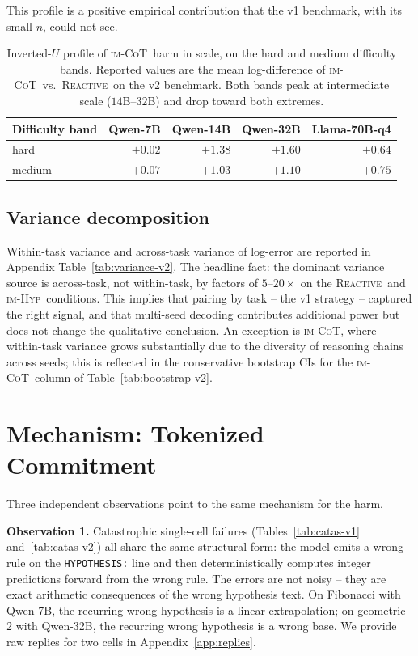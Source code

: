 \documentclass[11pt]{article}
\newcommand{\imhyp}{\textsc{im-Hyp}}
\newcommand{\imcot}{\textsc{im-CoT}}
\newcommand{\reactive}{\textsc{Reactive}}
\begin{document}
This profile is a positive empirical contribution that the v1
benchmark, with its small $n$, could not see.

\begin{table}[t]
\centering
\caption{Inverted-$U$ profile of \imcot\ harm in scale, on the
hard and medium difficulty bands.  Reported values are the mean
log-difference of \imcot\ vs.\ \reactive\ on the v2 benchmark.
Both bands peak at intermediate scale ($14$B--$32$B) and drop
toward both extremes.}
\label{fig:invertedU}
\small
\begin{tabular}{l rrrr}
\toprule
Difficulty band & Qwen-7B & Qwen-14B & Qwen-32B & Llama-70B-q4 \\
\midrule
hard   & $+0.02$ & $+1.38$ & $+1.60$ & $+0.64$ \\
medium & $+0.07$ & $+1.03$ & $+1.10$ & $+0.75$ \\
\bottomrule
\end{tabular}
\end{table}

\subsection{Variance decomposition}

Within-task variance and across-task variance of log-error are
reported in Appendix Table~\ref{tab:variance-v2}.  The headline
fact:  the dominant variance source is across-task, not
within-task, by factors of $5$--$20\times$ on the \reactive\ and
\imhyp\ conditions.  This implies that pairing by task -- the v1
strategy -- captured the right signal, and that multi-seed
decoding contributes additional power but does not change the
qualitative conclusion.  An exception is \imcot, where within-task
variance grows substantially due to the diversity of reasoning
chains across seeds; this is reflected in the conservative
bootstrap CIs for the \imcot\ column of
Table~\ref{tab:bootstrap-v2}.

\section{Mechanism: Tokenized Commitment}
\label{sec:mechanism}

Three independent observations point to the same mechanism for
the harm.

\textbf{Observation 1.}  Catastrophic single-cell failures
(Tables~\ref{tab:catas-v1} and~\ref{tab:catas-v2}) all share the
same structural form:  the model emits a wrong rule on the
\verb|HYPOTHESIS:| line and then deterministically computes
integer predictions forward from the wrong rule.  The errors are
not noisy -- they are exact arithmetic consequences of the wrong
hypothesis text.  On Fibonacci with Qwen-7B, the recurring wrong
hypothesis is a linear extrapolation; on geometric-2 with Qwen-32B,
the recurring wrong hypothesis is a wrong base.  We provide raw
replies for two cells in Appendix~\ref{app:replies}.
\end{document}
